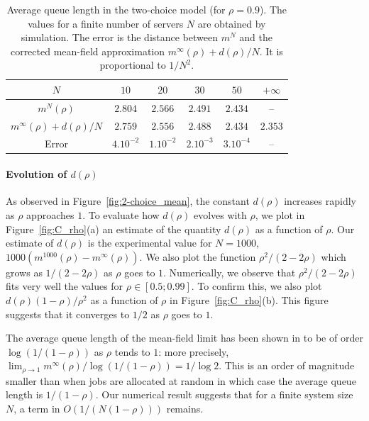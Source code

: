 \documentclass[sigconf]{acmart}
\begin{document}
\begin{table}[t]
  \centering
  \begin{tabular}{@{}|@{}c@{}|c|c|c|c|c|}
    \hline
    $N$
    &$  10$  &$  20$  &$  30$  &$  50$ & $+\infty$  \\\hline $m^N(\rho)$
    &$2.804$ &$2.566$ &$2.491$ &$2.434$&-- \\\hline $m^\infty(\rho){+}d(\rho)/N$ 
    &$2.759$ &$2.556$ &$2.488$ &$2.434$&$2.353$ \\\hline Error
    &$4. 10^{-2}$&$1 . 10^{-2}$&$2 .10^{-3}$&$3 . 10^{-4}$&--\\
    \hline
  \end{tabular}
  \caption{Average queue length in the two-choice model (for
    $\rho=0.9$). The values for a finite number of servers  $N$ are obtained by
    simulation. The error is the distance between $m^N$ and the
    corrected mean-field approximation $m^\infty(\rho)+d(\rho)/N$. It is
    proportional to $1/N^2$.}
  \label{tab:2}
\end{table}



\paragraph*{Evolution of $d(\rho)$}
As observed in Figure~\ref{fig:2-choice_mean}, the constant $d(\rho)$
increases rapidly as $\rho$ approaches $1$.  To evaluate how $d(\rho)$
evolves with $\rho$, we plot in Figure~\ref{fig:C_rho}(a) an estimate
of the quantity $d(\rho)$ as a function of $\rho$. Our estimate of
$d(\rho)$ is the experimental value for $N=1000$,
$1000(m^{1000}(\rho)-m^\infty(\rho))$.  We also plot the function
$\rho^2/(2-2\rho)$ which grows as $1/(2-2\rho)$ as $\rho$ goes to $1$.
Numerically, we observe that $\rho^2/(2-2\rho)$ fits very well the
values for $\rho\in[0.5;0.99]$. To confirm this, we also plot
$d(\rho)(1-\rho)/\rho^2$ as a function of $\rho$ in
Figure~\ref{fig:C_rho}(b). This figure suggests that it converges to
$1/2$ as $\rho$ goes to $1$.

The average queue length of the mean-field limit has been shown in
\cite{mitzenmacher1996power} to be of order $\log (1/(1-\rho))$ as
$\rho$ tends to $1$: more precisely,
$\lim_{\rho\to1}m^\infty(\rho) / \log(1/(1-\rho)) = 1/\log2$.  This is
an order of magnitude smaller than when jobs are allocated at random
in which case the average queue length is $1/(1-\rho)$. Our numerical
result suggests that for a finite system size $N$, a term in
$O(1/(N(1-\rho)))$ remains.
\end{document}

